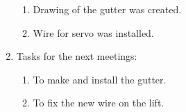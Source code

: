 \begin{enumerate}
\begin{enumerate}
  	  \item Drawing of the gutter was created.
		
      \item Wire for servo was installed.
		
	\end{enumerate}
	
	\item Tasks for the next meetings:
	\begin{enumerate}
		
	  \item To make and install the gutter.
		
	  \item To fix the new wire on the lift.
			
	\end{enumerate}
\end{enumerate}
\fillpage
